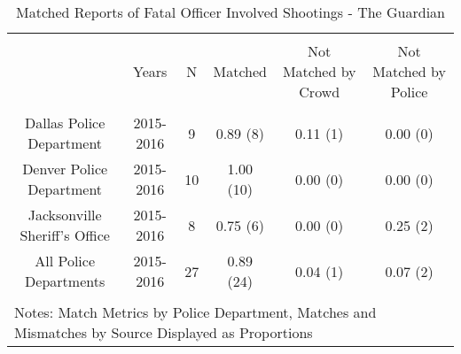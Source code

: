 
\begin{table}[!htbp] \centering 
  \caption{Matched Reports of Fatal Officer Involved Shootings - The Guardian} 
  \label{} 
\footnotesize 
\begin{tabular}{@{\extracolsep{5pt}} cccccc} 
\\[-1.8ex]\hline 
\hline \\[-1.8ex] 
 & Years & N & Matched & Not Matched by Crowd & Not Matched by Police \\ 
\hline \\[-1.8ex] 
Dallas Police Department & 2015-2016 & 9 & 0.89 (8) & 0.11 (1) & 0.00 (0) \\ 
Denver Police Department & 2015-2016 & 10 & 1.00 (10) & 0.00 (0) & 0.00 (0) \\ 
Jacksonville Sheriff's Office & 2015-2016 & 8 & 0.75 (6) & 0.00 (0) & 0.25 (2) \\ 
All Police Departments   & 2015-2016 & 27 & 0.89 (24) & 0.04 (1) & 0.07 (2) \\ 
\hline \\[-1.8ex] 
\multicolumn{6}{l}{Notes: Match Metrics by Police Department, Matches and Mismatches by Source Displayed as Proportions} \\ 
\end{tabular} 
\end{table}  
